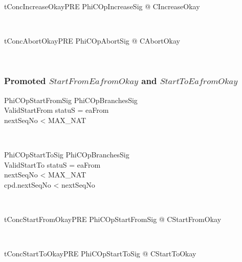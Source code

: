 \begin{LNewThm}
\begin{theorem}{tConcIncreaseOkayPRE}
    \forall PhiCOpIncreaseSig @ \pre CIncreaseOkay
\end{theorem}~\end{LNewThm}

\begin{LNewThm}
\begin{theorem}{tConcAbortOkayPRE}
   \forall PhiCOpAbortSig @  \pre CAbortOkay
\end{theorem}~\end{LNewThm}

\subsubsection{Promoted $StartFromEafromOkay$ and $StartToEafromOkay$}

\begin{LNewSDef}
\begin{schema}{PhiCOpStartFromSig}
    PhiCOpBranchesSig \\
    ValidStartFrom
\where
    statuS = eaFrom \\
    nextSeqNo < MAX\_NAT \\
\end{schema}~\end{LNewSDef}

\begin{LNewSDef}
\begin{schema}{PhiCOpStartToSig}
    PhiCOpBranchesSig \\
    ValidStartTo
\where
    statuS = eaFrom \\
    nextSeqNo < MAX\_NAT \\
    cpd.nextSeqNo < nextSeqNo
\end{schema}~\end{LNewSDef}

\begin{LNewThm}
\begin{theorem}{tConcStartFromOkayPRE}
   \forall PhiCOpStartFromSig @ \pre CStartFromOkay
\end{theorem}~\end{LNewThm}

\begin{LNewThm}
\begin{theorem}{tConcStartToOkayPRE}
   \forall PhiCOpStartToSig @ \pre CStartToOkay
\end{theorem}~\end{LNewThm}

